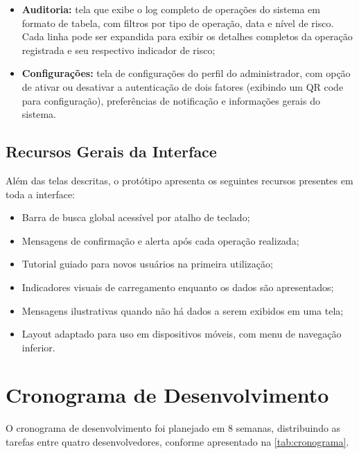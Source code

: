 \documentclass[
  article,
  a4paper,
  12pt,
  oneside,
  fleqn
]{abntex2}
\begin{document}
\begin{itemize}
    \item \textbf{Auditoria:} tela que exibe o log completo de operações do sistema em formato de tabela, com filtros por tipo de operação, data e nível de risco. Cada linha pode ser expandida para exibir os detalhes completos da operação registrada e seu respectivo indicador de risco;

    \item \textbf{Configurações:} tela de configurações do perfil do administrador, com opção de ativar ou desativar a autenticação de dois fatores (exibindo um QR code para configuração), preferências de notificação e informações gerais do sistema.
\end{itemize}

\subsection{Recursos Gerais da Interface}

Além das telas descritas, o protótipo apresenta os seguintes recursos presentes em toda a interface:

\begin{itemize}
    \item Barra de busca global acessível por atalho de teclado;
    \item Mensagens de confirmação e alerta após cada operação realizada;
    \item Tutorial guiado para novos usuários na primeira utilização;
    \item Indicadores visuais de carregamento enquanto os dados são apresentados;
    \item Mensagens ilustrativas quando não há dados a serem exibidos em uma tela;
    \item Layout adaptado para uso em dispositivos móveis, com menu de navegação inferior.
\end{itemize}

\section{Cronograma de Desenvolvimento}

O cronograma de desenvolvimento foi planejado em 8 semanas, distribuindo as tarefas entre quatro desenvolvedores, conforme apresentado na \cref{tab:cronograma}.
\end{document}
